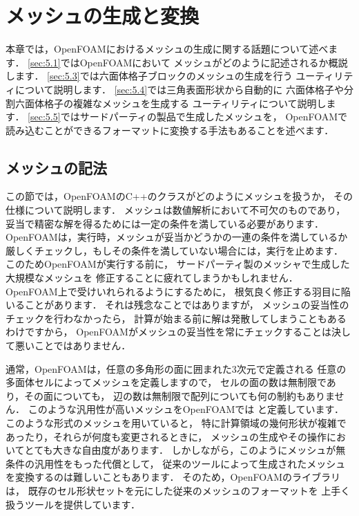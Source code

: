 \chapter{メッシュの生成と変換}
\label{chap:5}
本章では，OpenFOAMにおけるメッシュの生成に関する話題について述べます．
\autoref{sec:5.1}ではOpenFOAMにおいて
メッシュがどのように記述されるか概説します．
\autoref{sec:5.3}では六面体格子ブロックのメッシュの生成を行う
ユーティリティについて説明します．
\autoref{sec:5.4}では三角表面形状から自動的に
六面体格子や分割六面体格子の複雑なメッシュを生成する
ユーティリティについて説明します．
\autoref{sec:5.5}ではサードパーティの製品で生成したメッシュを，
OpenFOAMで読み込むことができるフォーマットに変換する手法もあることを述べます．



\section{メッシュの記法}
\label{sec:5.1}
%
この節では，OpenFOAMのC++のクラスがどのようにメッシュを扱うか，
その仕様について説明します．
メッシュは数値解析において不可欠のものであり，
妥当で精密な解を得るためには一定の条件を満している必要があります．
OpenFOAMは，実行時，メッシュが妥当かどうかの一連の条件を満しているか
厳しくチェックし，もしその条件を満していない場合には，実行を止めます．
このためOpenFOAMが実行する前に，
サードパーティ製のメッシャで生成した大規模なメッシュを
修正することに疲れてしまうかもしれません．
OpenFOAM上で受けいれられるようにするために，
根気良く修正する羽目に陥いることがあります．
それは残念なことではありますが，
メッシュの妥当性のチェックを行わなかったら，
計算が始まる前に解は発散してしまうこともあるわけですから，
OpenFOAMがメッシュの妥当性を常にチェックすることは決して悪いことではありません．

通常，OpenFOAMは，任意の多角形の面に囲まれた3次元で定義される
任意の多面体セルによってメッシュを定義しますので，
セルの面の数は無制限であり，その面についても，
辺の数は無制限で配列についても何の制約もありません．
このような汎用性が高いメッシュをOpenFOAMでは
%
%
と定義しています．
このような形式のメッシュを用いていると，
特に計算領域の幾何形状が複雑であったり，それらが何度も変更されるときに，
メッシュの生成やその操作においてとても大きな自由度があります．
しかしながら，このようにメッシュが無条件の汎用性をもった代償として，
従来のツールによって生成されたメッシュを変換するのは難しいこともあります．
そのため，OpenFOAMのライブラリは，
既存のセル形状セットを元にした従来のメッシュのフォーマットを
上手く扱うツールを提供しています．


